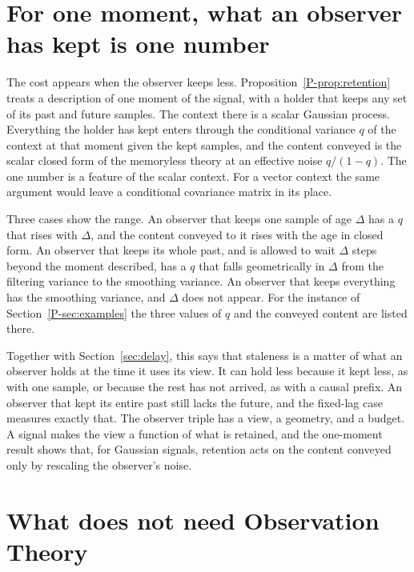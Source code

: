 \documentclass[11pt]{article}
\newcommand{\Pp}[1]{Proposition~\ref{P-#1}}
\newcommand{\Se}[1]{Section~\ref{P-#1}}
\begin{document}
\section{For one moment, what an observer has kept is one number}
\label{sec:kept}

The cost appears when the observer keeps less. \Pp{prop:retention}
treats a description of one moment of the signal, with a holder that
keeps any set of its past and future samples. The context there is a
scalar Gaussian process. Everything the holder has kept
enters through the conditional variance $q$ of the context at that
moment given the kept samples, and the content conveyed is the scalar
closed form of the memoryless theory at an effective noise $q/(1-q)$.
The one number is a feature of the scalar context. For a vector context
the same argument would leave a conditional covariance matrix in its
place.

Three cases show the range. An observer that keeps one sample of age
$\Delta$ has a $q$ that rises with $\Delta$, and the content conveyed to
it rises with the age in closed form. An observer that keeps its whole
past, and is allowed to wait $\Delta$ steps beyond the moment
described, has a $q$ that falls geometrically in $\Delta$ from the
filtering variance to the smoothing variance. An observer that keeps
everything has the smoothing variance, and $\Delta$ does not appear.
For the instance of \Se{sec:examples} the three values of $q$ and the
conveyed content are listed there.

Together with Section~\ref{sec:delay}, this says that staleness is a
matter of what an observer holds at the time it uses its view. It can
hold less because it kept less, as with one sample, or because the rest
has not arrived, as with a causal prefix. An observer that kept its
entire past still lacks the future, and the fixed-lag case measures
exactly that. The observer triple has a view, a
geometry, and a budget. A signal makes the view a function of what is
retained, and the one-moment result shows that, for Gaussian signals,
retention acts on the content conveyed only by rescaling the observer's
noise.

\section{What does not need Observation Theory}
\label{sec:standard}
\end{document}

